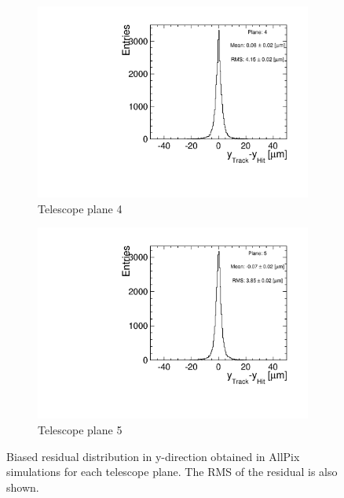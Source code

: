 \begin{figure}[htbp]
\begin{subfigure}[b]{0.3\textwidth}
    \includegraphics[width=\textwidth]{figures/Telescope/biasedResiduals/BiasedResiduals_run49_PlaneYRMS4.pdf}
    \caption{Telescope plane 4}
  \end{subfigure}\hfill
  \begin{subfigure}[b]{0.3\textwidth}
    \includegraphics[width=\textwidth]{figures/Telescope/biasedResiduals/BiasedResiduals_run49_PlaneYRMS5.pdf}
    \caption{Telescope plane 5}
  \end{subfigure}
  \caption{Biased residual distribution in y-direction obtained in
    AllPix simulations for each telescope plane. The RMS of the
    residual is also shown.}
  \label{fig:telescope_biasedResiduals_simu_Y}
\end{figure}
